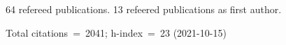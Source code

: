 64 refereed publications. 13 refeered publications as first author.

Total citations~=~2041; h-index~=~23 (2021-10-15)
